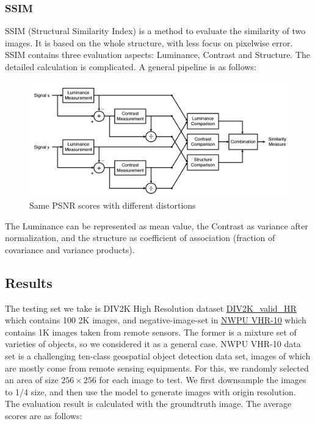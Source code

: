 \documentclass{article}
\begin{document}
    \subsubsection{SSIM}   
      SSIM (Structural Similarity Index) is a method to evaluate the similarity of two images.
      It is based on the whole structure, with less focus on pixelwise error. 
      SSIM contains three evaluation aspects: Luminance, Contrast and Structure.
      The detailed calculation is complicated. A general pipeline is as follows:
      \begin{figure}[H]
          \centering
          \includegraphics[scale = 0.2]{images/SSIM.png}
          \caption{Same PSNR scores with different distortions}
      \end{figure}
      The Luminance can be represented as mean value, the Contrast as variance after normalization, 
      and the structure as coefficient of association (fraction of covariance and variance products).
  

  \subsection{Results}
  The testing set we take is DIV2K High Resolution dataset \href{https://data.vision.ee.ethz.ch/cvl/DIV2K}{DIV2K\_valid\_HR} 
  which contains 100 2K images, and negative-image-set in \href{https://hyper.ai/datasets/5422}{NWPU VHR-10} which contains 1K images taken from remote sensors.
  The former is a mixture set of varieties of objects, so we considered it as a general case.
  NWPU VHR-10 data set is a challenging ten-class geospatial object detection data set, images of which are mostly come from remote sensing equipments. 
  For this, we randomly selected an area of size $256\times 256$ for each image to test.
  We first downsample the images to 1/4 size, and then use the model to generate images with origin resolution.
  The evaluation result is calculated with the groundtruth image.
  The average scores are as follows:
\end{document}
